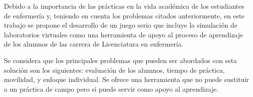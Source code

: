 %
%
%



Debido a la importancia de las prácticas en la vida académica de los estudiantes de enfermería y, teniendo en cuenta los problemas citados anteriormente, en este trabajo se propone el desarrollo de un juego serio que 
incluye la simulación de laboratorios virtuales como una herramienta de apoyo 
al proceso de aprendizaje de los alumnos de las carrera de Licenciatura en enfermería. 

Se considera que los principales problemas que pueden ser abordados con esta solución son los siguientes: evaluación de los alumnos, tiempo de práctica, movilidad, y enfoque individual. Se ofrece una herramienta que no puede sustituir a un práctica de campo pero si puede servir como apoyo al aprendizaje.

